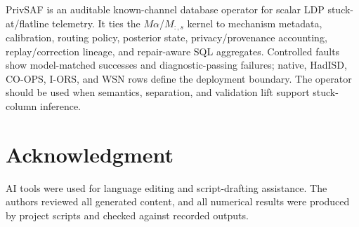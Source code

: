 \documentclass[conference]{IEEEtran}
\begin{document}
PrivSAF is an auditable known-channel database operator for scalar LDP stuck-at/flatline telemetry. It ties the \(M\alpha\)/\(M_{:,s}\) kernel to mechanism metadata, calibration, routing policy, posterior state, privacy/provenance accounting, replay/correction lineage, and repair-aware SQL aggregates. Controlled faults show model-matched successes and diagnostic-passing failures; native, HadISD, CO-OPS, I-ORS, and WSN rows define the deployment boundary. The operator should be used when semantics, separation, and validation lift support stuck-column inference.

\section*{Acknowledgment}

AI tools were used for language editing and script-drafting assistance. The authors reviewed all generated content, and all numerical results were produced by project scripts and checked against recorded outputs.



\end{document}

